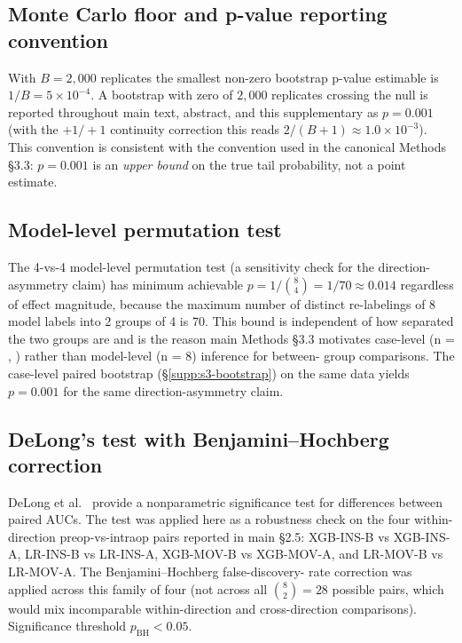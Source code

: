 \documentclass[11pt,a4paper]{article}
\begin{document}
\subsection{Monte Carlo floor and p-value reporting convention}\label{supp:s3-mc-floor}

With $B = 2{,}000$ replicates the smallest non-zero bootstrap p-value
estimable is $1/B = 5 \times 10^{-4}$. A bootstrap with zero of $2{,}000$
replicates crossing the null is reported throughout main text, abstract, and
this supplementary as \textbf{$p = 0.001$} (with the $+1/+1$ continuity
correction this reads $2/(B+1) \approx 1.0 \times 10^{-3}$). This convention
is consistent with the convention used in the canonical Methods
\S3.3: $p = 0.001$ is an \emph{upper bound} on the true tail probability, not
a point estimate.

\subsection{Model-level permutation test}\label{supp:s3-permutation}

The 4-vs-4 model-level permutation test (a sensitivity check for the
direction-asymmetry claim) has minimum achievable $p = 1/\binom{8}{4} =
1/70 \approx 0.014$ regardless of effect magnitude, because the maximum
number of distinct re-labelings of 8 model labels into 2 groups of 4 is 70.
This bound is independent of how separated the two groups are and is the
reason main Methods \S3.3 motivates case-level (n = \pnTableOneNInspire,
\pnTableOneNMover) rather than model-level (n = 8) inference for between-
group comparisons. The case-level paired bootstrap (\S\ref{supp:s3-bootstrap})
on the same data yields $p = 0.001$ for the same direction-asymmetry claim.

\subsection{DeLong's test with Benjamini--Hochberg correction}\label{supp:s3-delong}

DeLong et al.~\cite{DeLong1988} provide a nonparametric significance test
for differences between paired AUCs. The test was applied here as a
robustness check on the four within-direction preop-vs-intraop pairs reported
in main \S2.5: XGB-INS-B vs XGB-INS-A, LR-INS-B vs LR-INS-A, XGB-MOV-B vs
XGB-MOV-A, and LR-MOV-B vs LR-MOV-A. The Benjamini--Hochberg false-discovery-
rate correction was applied across this family of four (not across all
$\binom{8}{2} = 28$ possible pairs, which would mix incomparable
within-direction and cross-direction comparisons). Significance threshold
$p_{\text{BH}} < 0.05$.
\end{document}
